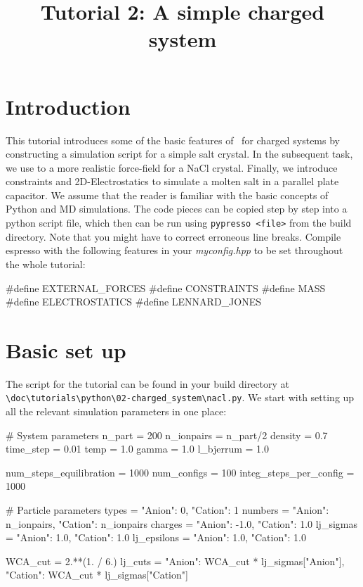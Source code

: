 \documentclass[
a4paper,                        %
11pt,                           %
twoside,                        %
footsepline,                    %
headsepline,                    %
headexclude,                    %
footexclude,                    %
pagesize,                       %
]{scrartcl}
\begin{document}
\esptitlehead
\title{Tutorial 2: A simple charged system%
}

\maketitle
\tableofcontents

\section{Introduction}

This tutorial introduces some of the basic features of \es\ for charged systems
by constructing a simulation script for a simple salt crystal. In the subsequent task,
we use to a more realistic force-field for a NaCl crystal. Finally, we introduce constraints
and 2D-Electrostatics to simulate a molten salt in a parallel plate capacitor.
We assume that the reader is familiar with the basic concepts of Python and MD simulations. The
code pieces can be copied step by step into a python script file, which then can
be run using \verb|pypresso <file>| from the \es build directory. Note that you might 
have to correct erroneous line breaks. Compile espresso with the following features 
in your \emph{myconfig.hpp} to be set throughout the whole tutorial:

\begin{pypresso}
#define EXTERNAL_FORCES
#define CONSTRAINTS
#define MASS
#define ELECTROSTATICS
#define LENNARD_JONES
\end{pypresso}

\section{Basic set up}

The script for the tutorial can be found in your build directory at\\
\verb|\doc\tutorials\python\02-charged_system\nacl.py|.
We start with setting up all the relevant simulation parameters in one place:

\begin{pypresso}
# System parameters
n_part = 200
n_ionpairs = n_part/2
density = 0.7
time_step = 0.01
temp = 1.0
gamma = 1.0
l_bjerrum = 1.0

num_steps_equilibration = 1000
num_configs = 100
integ_steps_per_config = 1000

# Particle parameters
types       = {"Anion":          0, "Cation": 1}
numbers     = {"Anion": n_ionpairs, "Cation": n_ionpairs}
charges     = {"Anion":       -1.0, "Cation": 1.0}
lj_sigmas   = {"Anion":        1.0, "Cation": 1.0}
lj_epsilons = {"Anion":        1.0, "Cation": 1.0}

WCA_cut = 2.**(1. / 6.)
lj_cuts     = {"Anion":  WCA_cut * lj_sigmas["Anion"], 
               "Cation": WCA_cut * lj_sigmas["Cation"]}
\end{pypresso}
\end{document}
